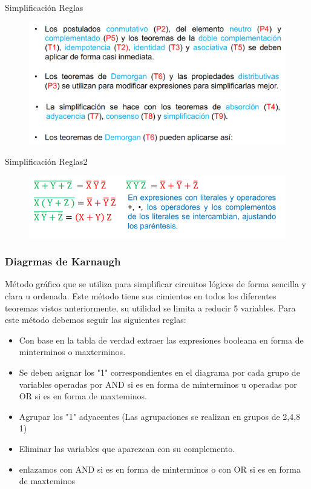 \documentclass[aspectratio=169]{beamer}
\begin{document}
\begin{frame}{Simplificación Reglas}
    \begin{figure}
        \includegraphics[scale=.28]{fig/reg_1.png}
    \end{figure}
\end{frame}

\begin{frame}{Simplificación Reglas2}
    \begin{figure}
        \includegraphics[scale=.4]{fig/reg_2.png}
    \end{figure}
\end{frame}

\begin{frame}
\frametitle{Diagrmas de Karnaugh}

Método gráfico que se utiliza para simplificar circuitos lógicos de forma sencilla y clara u ordenada. Este método tiene sus cimientos en todos los diferentes teoremas vistos anteriormente, su utilidad se limita a reducir 5 variables. Para este método debemos seguir las siguientes reglas:

\begin{itemize}
    \item Con base en la tabla de verdad extraer las expresiones booleana en forma de minterminos o maxterminos.
    \item Se deben asignar los "1" correspondientes en el diagrama por cada grupo de variables operadas por AND si es en forma de minterminos u operadas por OR si es en forma de maxteminos.
    \item Agrupar los "1" adyacentes (Las agrupaciones se realizan en grupos de 2,4,8 1)
    \item Eliminar las variables que aparezcan con su complemento.
    \item enlazamos con AND si es en forma de minterminos o con OR si es en forma de maxteminos
\end{itemize}
    
\end{frame}
\end{document}
